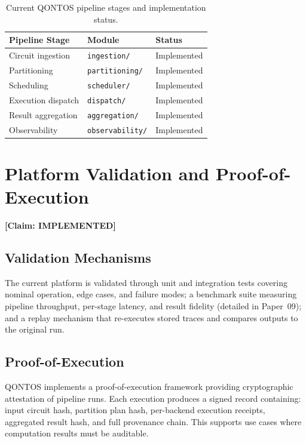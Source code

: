 \documentclass[conference]{IEEEtran}
\begin{document}
\begin{table}[H]
\centering
\caption{Current QONTOS pipeline stages and implementation status.}
\label{tab:pipeline-stages}
\footnotesize
\begin{tabularx}{\columnwidth}{L{2.5cm}L{2.5cm}l}
\toprule
\textbf{Pipeline Stage} & \textbf{Module} & \textbf{Status} \\
\midrule
Circuit ingestion & \texttt{ingestion/} & Implemented \\
Partitioning & \texttt{partitioning/} & Implemented \\
Scheduling & \texttt{scheduler/} & Implemented \\
Execution dispatch & \texttt{dispatch/} & Implemented \\
Result aggregation & \texttt{aggregation/} & Implemented \\
Observability & \texttt{observability/} & Implemented \\
\bottomrule
\end{tabularx}
\end{table}

\section{Platform Validation and Proof-of-Execution}

\textbf{[Claim: IMPLEMENTED]}

\subsection{Validation Mechanisms}

The current platform is validated through unit and integration tests covering nominal operation, edge cases, and failure modes; a benchmark suite measuring pipeline throughput, per-stage latency, and result fidelity (detailed in Paper~09); and a replay mechanism that re-executes stored traces and compares outputs to the original run.

\subsection{Proof-of-Execution}

QONTOS implements a proof-of-execution framework providing cryptographic attestation of pipeline runs. Each execution produces a signed record containing: input circuit hash, partition plan hash, per-backend execution receipts, aggregated result hash, and full provenance chain. This supports use cases where computation results must be auditable.
\end{document}
